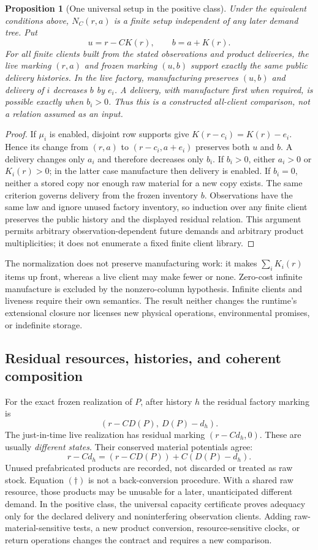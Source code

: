 \documentclass[11pt]{article}
\newtheorem{proposition}[theorem]{Proposition}
\theoremstyle{definition}
\theoremstyle{remark}
\begin{document}
\begin{proposition}[One universal setup in the positive class]
\label{arc:uniform}
Under the equivalent conditions above, $N_C(r,a)$ is a finite setup
independent of any later demand tree. Put
\[
 u=r-CK(r),\qquad b=a+K(r).
\]
For all finite clients built from the stated observations and product
deliveries, the live marking $(r,a)$ and frozen marking $(u,b)$ support
exactly the same public delivery histories. In the live factory,
manufacturing preserves $(u,b)$ and delivery of $i$ decreases $b$ by
$e_i$. A delivery, with manufacture first when required, is possible
exactly when $b_i>0$. Thus this is a constructed all-client comparison,
not a relation assumed as an input.
\end{proposition}
\begin{proof}
If $\mu_i$ is enabled, disjoint row supports give
$K(r-c_i)=K(r)-e_i$. Hence its change from $(r,a)$ to
$(r-c_i,a+e_i)$ preserves both $u$ and $b$.
A delivery changes only $a_i$ and therefore decreases only $b_i$.
If $b_i>0$, either $a_i>0$ or $K_i(r)>0$; in the latter case manufacture
then delivery is enabled. If $b_i=0$, neither a stored copy nor enough raw
material for a new copy exists. The same criterion governs delivery from
the frozen inventory $b$. Observations have the same law and ignore unused
factory inventory, so induction over any finite client preserves the
public history and the displayed residual relation. This argument permits
arbitrary observation-dependent future demands and arbitrary product
multiplicities; it does not enumerate a fixed finite client library.
\end{proof}

The normalization does not preserve manufacturing work: it makes
$\sum_iK_i(r)$ items up front, whereas a live client may make fewer or
none. Zero-cost infinite manufacture is excluded by the nonzero-column
hypothesis. Infinite clients and liveness require their own semantics.
The result neither changes the runtime's extensional closure nor licenses
new physical operations, environmental promises, or indefinite storage.

\subsection{Residual resources, histories, and coherent composition}
For the exact frozen realization of $P$, after history $h$ the residual
factory marking is
\[
 (r-CD(P),\ D(P)-d_h).
\]
The just-in-time live realization has residual marking $(r-Cd_h,0)$.
These are usually \emph{different states}. Their conserved material
potentials agree:
\[
 r-Cd_h=(r-CD(P))+C(D(P)-d_h).
\tag{$\dagger$}
\]
Unused prefabricated products are recorded, not discarded or treated as
raw stock. Equation $(\dagger)$ is not a back-conversion procedure.
With a shared raw resource, those products may be unusable for a later,
unanticipated different demand. In the positive class, the universal
capacity certificate proves adequacy only for the declared delivery and
noninterfering observation clients. Adding raw-material-sensitive tests,
a new product conversion, resource-sensitive clocks, or return operations
changes the contract and requires a new comparison.
\end{document}
